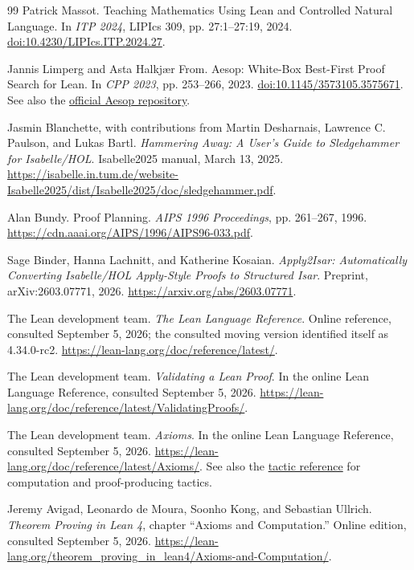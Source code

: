 \documentclass[11pt,a4paper]{article}
\theoremstyle{definition}
\theoremstyle{remark}
\numberwithin{equation}{section}
\begin{document}
\begin{thebibliography}{99}
Patrick Massot.
Teaching Mathematics Using Lean and Controlled Natural Language.
In \emph{ITP 2024}, LIPIcs 309, pp. 27:1--27:19, 2024.
\href{https://doi.org/10.4230/LIPIcs.ITP.2024.27}{doi:10.4230/LIPIcs.ITP.2024.27}.

Jannis Limperg and Asta Halkj{\ae}r From.
Aesop: White-Box Best-First Proof Search for Lean.
In \emph{CPP 2023}, pp. 253--266, 2023.
\href{https://doi.org/10.1145/3573105.3575671}{doi:10.1145/3573105.3575671}.
See also the \href{https://github.com/leanprover-community/aesop}{official Aesop repository}.

Jasmin Blanchette, with contributions from Martin Desharnais, Lawrence C. Paulson, and Lukas Bartl.
\emph{Hammering Away: A User's Guide to Sledgehammer for Isabelle/HOL}.
Isabelle2025 manual, March 13, 2025.
\url{https://isabelle.in.tum.de/website-Isabelle2025/dist/Isabelle2025/doc/sledgehammer.pdf}.

Alan Bundy.
Proof Planning.
\emph{AIPS 1996 Proceedings}, pp. 261--267, 1996.
\url{https://cdn.aaai.org/AIPS/1996/AIPS96-033.pdf}.

Sage Binder, Hanna Lachnitt, and Katherine Kosaian.
\emph{Apply2Isar: Automatically Converting Isabelle/HOL Apply-Style Proofs to Structured Isar}.
Preprint, arXiv:2603.07771, 2026.
\url{https://arxiv.org/abs/2603.07771}.

The Lean development team.
\emph{The Lean Language Reference}.
Online reference, consulted September 5, 2026; the consulted moving version identified itself as 4.34.0-rc2.
\url{https://lean-lang.org/doc/reference/latest/}.

The Lean development team.
\emph{Validating a Lean Proof}.
In the online Lean Language Reference, consulted September 5, 2026.
\url{https://lean-lang.org/doc/reference/latest/ValidatingProofs/}.

The Lean development team.
\emph{Axioms}.
In the online Lean Language Reference, consulted September 5, 2026.
\url{https://lean-lang.org/doc/reference/latest/Axioms/}.
See also the \href{https://lean-lang.org/doc/reference/latest/Tactic-Proofs/Tactic-Reference/}{tactic reference} for computation and proof-producing tactics.

Jeremy Avigad, Leonardo de Moura, Soonho Kong, and Sebastian Ullrich.
\emph{Theorem Proving in Lean 4}, chapter ``Axioms and Computation.''
Online edition, consulted September 5, 2026.
\url{https://lean-lang.org/theorem_proving_in_lean4/Axioms-and-Computation/}.



\end{thebibliography}
\end{document}
